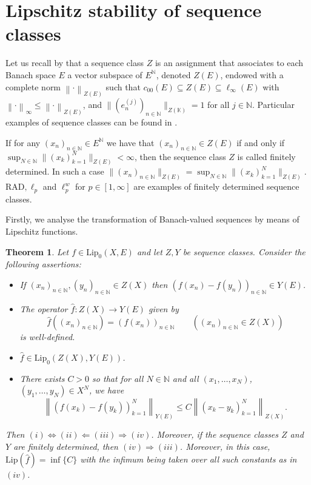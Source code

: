 \documentclass[12pt]{amsart}
\newtheorem{theorem}{Theorem}[section]
\def\K{\mathbb{K}}
\def\N{\mathbb{N}}
\def\Lip{\mathrm{Lip}_0}
\def\Lipnorm{\mathrm{Lip}}
\def\RAD{\mathrm{RAD}}
\begin{document}

\section{Lipschitz stability of sequence classes}\label{Sec 2}

Let us recall by \cite[Definition 2.1]{BotCam-17} that a sequence class $Z$ is an assignment that associates to each Banach space $E$ a vector subspace of $E^\N$, denoted $Z(E)$, endowed with a complete norm $\left\|\cdot\right\|_{Z(E)}$ such that $c_{00}(E) \subseteq Z(E) \subseteq \ell_\infty(E)$ with $\left\|\cdot\right\|_\infty \leq \left\|\cdot\right\|_{Z(E)}$, and $\|(e_n^{(j)})_{n\in\N}\|_{Z(\K)}=1$ for all $j \in \N$. Particular examples of sequence classes can be found in \cite[Example 2.2]{BotCam-17}.

If for any $(x_n)_{n\in\N} \in E^\N$ we have that $(x_n)_{n\in\N}\in Z(E)$ if and only if $\sup_{N\in\N} \|(x_k)_{k=1}^N\|_{Z(E)}<\infty$, then the sequence class $Z$ is called finitely determined. In such a case $\|(x_n)_{n\in\N}\|_{Z(E)}=\sup_{N\in\N}\|(x_k)_{k=1}^N\|_{Z(E)}$. $\RAD,\ell_p$ and $\ell_p^w$ for $p\in [1,\infty]$ are examples of finitely determined sequence classes.

Firstly, we analyse the transformation of Banach-valued sequences by means of Lipschitz functions.

\begin{theorem}\label{Th 1}
	Let $f\in \Lip(X,E)$ and let $Z,Y$ be sequence classes. Consider the following assertions:
	\begin{itemize}
		\item[$(i)$] If $(x_n)_{n\in\N},(y_n)_{n\in\N}\in Z(X)$ then $(f(x_n)-f(y_n))_{n\in\N}\in Y(E)$.
		\item[$(ii)$] The operator $\hat{f}: Z(X)\to Y(E)$ given by
		$$
		\hat{f}((x_n)_{n\in\N}) = (f(x_n))_{n\in\N} \qquad ((x_n)_{n\in\N} \in Z(X))
		$$
		is well-defined.
		\item[$(iii)$] $\hat{f} \in \Lip(Z(X),Y(E))$.
		\item[$(iv)$] There exists $C>0$ so that for all $N\in \N$ and all $(x_1,\ldots,x_N)$, $(y_1,\ldots,y_N)\in X^N$, we have
		$$
		\left\|(f(x_k)-f(y_k))_{k=1}^N\right\|_{Y(E)} \leq C\left\|(x_k-y_k)_{k=1}^N\right\|_{Z(X)}.
		$$
	\end{itemize}
	Then $(i) \Leftrightarrow (ii) \Leftarrow (iii) \Rightarrow (iv)$.  Moreover, if the sequence classes $Z$ and $Y$ are finitely determined, then $(iv) \Rightarrow (iii)$. Moreover, in this case, $\Lipnorm(\hat{f}) = \inf\{C\}$ with the infimum being taken over all such constants as in $(iv)$.
\end{theorem}
\end{document}
